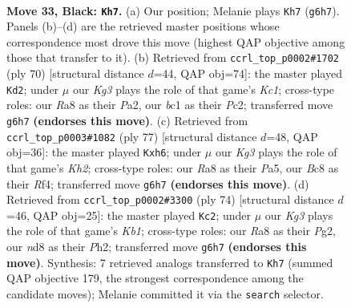 \documentclass[11pt]{article}
\begin{document}
\clearpage

\begin{figure}[p]\centering
\begin{subfigure}{0.46\textwidth}\centering
\resizebox{\linewidth}{!}{%
\newchessgame
\chessboard[
  setfen={r1bN4/p7/n3p1k1/P1Pp4/1P6/2P5/5K2/R1B5 b - - 1 33},
  showmover=false,
  pgfstyle=straightmove, color=movearrow, markmove={g6-h7}
]}
\caption{}
\end{subfigure}\hfill
\begin{subfigure}{0.46\textwidth}\centering
\resizebox{\linewidth}{!}{%
\newchessgame
\chessboard[
  setfen={4r1k1/6p1/3RPp1p/p2N4/1p6/1P5b/P1P4P/2K5 w - - 4 36},
  showmover=false,
  pgfstyle=straightmove, color=movearrow, markmove={c1-d2}
]}
\caption{}
\end{subfigure}
\\[4pt]
\begin{subfigure}{0.46\textwidth}\centering
\resizebox{\linewidth}{!}{%
\newchessgame
\chessboard[
  setfen={8/5p1k/3N2pP/p7/Pp3rn1/1P1R4/2P4P/2K5 b - - 3 39},
  showmover=false,
  pgfstyle=straightmove, color=movearrow, markmove={h7-h6}
]}
\caption{}
\end{subfigure}\hfill
\begin{subfigure}{0.46\textwidth}\centering
\resizebox{\linewidth}{!}{%
\newchessgame
\chessboard[
  setfen={2r5/3n1k1p/2p2bp1/1p6/1N2R3/1P6/P2B2PP/1K6 w - - 7 38},
  showmover=false,
  pgfstyle=straightmove, color=movearrow, markmove={b1-c2}
]}
\caption{}
\end{subfigure}
\caption{\textbf{Move 33, Black: \texttt{Kh7}.} (a) Our position; Melanie plays \texttt{Kh7} (\texttt{g6h7}). Panels (b)--(d) are the retrieved master positions whose correspondence most drove this move (highest QAP objective among those that transfer to it). (b) Retrieved from \texttt{ccrl\_top\_p0002\#1702} (ply 70) [structural distance $d$=44, QAP obj=74]: the master played \texttt{Kd2}; under $\mu$ our \emph{Kg3} plays the role of that game's \emph{Kc1}; cross-type roles: our \emph{R}a8 as their \emph{P}a2, our \emph{b}c1 as their \emph{P}c2; transferred move \texttt{g6h7} \textbf{(endorses this move)}. (c) Retrieved from \texttt{ccrl\_top\_p0003\#1082} (ply 77) [structural distance $d$=48, QAP obj=36]: the master played \texttt{Kxh6}; under $\mu$ our \emph{Kg3} plays the role of that game's \emph{Kh2}; cross-type roles: our \emph{R}a8 as their \emph{P}a5, our \emph{B}c8 as their \emph{R}f4; transferred move \texttt{g6h7} \textbf{(endorses this move)}. (d) Retrieved from \texttt{ccrl\_top\_p0002\#3300} (ply 74) [structural distance $d$=46, QAP obj=25]: the master played \texttt{Kc2}; under $\mu$ our \emph{Kg3} plays the role of that game's \emph{Kb1}; cross-type roles: our \emph{R}a8 as their \emph{P}g2, our \emph{n}d8 as their \emph{P}h2; transferred move \texttt{g6h7} \textbf{(endorses this move)}. Synthesis: 7 retrieved analogs transferred to \texttt{Kh7} (summed QAP objective 179, the strongest correspondence among the candidate moves); Melanie committed it via the \texttt{search} selector.}
\label{fig:thought-m65}
\end{figure}
\end{document}
